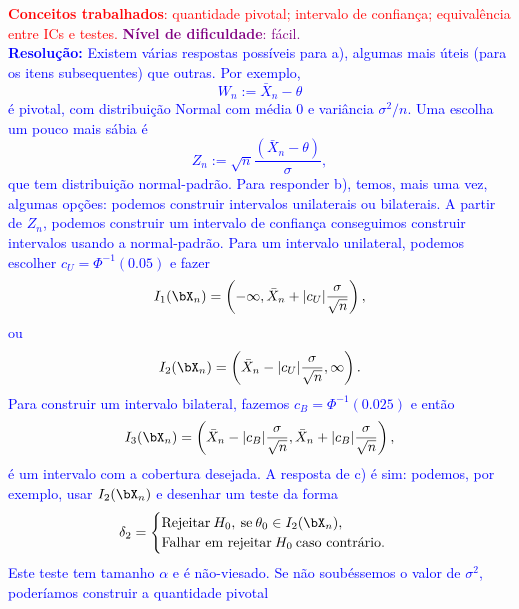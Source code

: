 \textcolor{red}{\textbf{Conceitos trabalhados}: quantidade pivotal; intervalo de confiança; equivalência entre ICs e testes.}
\textcolor{purple}{\textbf{Nível de dificuldade}: fácil.}\\
\textcolor{blue}{
\textbf{Resolução:}
Existem várias respostas possíveis para a), algumas mais úteis (para os itens subsequentes) que outras.
Por exemplo,
\begin{equation*}
    W_n := \bar{X}_n - \theta 
\end{equation*}
é pivotal, com distribuição Normal com média $0$ e variância $\sigma^2/n$.
Uma escolha um pouco mais sábia é 
\begin{equation*}
    Z_n := \sqrt{n}\frac{\left(\bar{X}_n - \theta\right)}{\sigma},
\end{equation*}
que tem distribuição normal-padrão.
Para responder b), temos, mais uma vez, algumas opções: podemos construir intervalos unilaterais ou bilaterais.
A partir de $Z_n$, podemos construir um intervalo de confiança conseguimos construir intervalos usando a normal-padrão. 
Para um intervalo unilateral, podemos escolher $c_U = \Phi^{-1}(0.05)$ e fazer
\begin{equation*}
    I_1(\bX_n) = \left(-\infty, \bar{X}_n + |c_U|\frac{\sigma}{\sqrt{n}}\right),
\end{equation*}
ou
\begin{equation*}
    I_2(\bX_n) = \left(\bar{X}_n - |c_U|\frac{\sigma}{\sqrt{n}}, \infty\right).
\end{equation*}
Para construir um intervalo bilateral, fazemos $c_B = \Phi^{-1}(0.025)$ e então
\begin{equation*}
    I_3(\bX_n) = \left(\bar{X}_n - |c_B|\frac{\sigma}{\sqrt{n}}, \bar{X}_n + |c_B|\frac{\sigma}{\sqrt{n}}\right),
\end{equation*}
é um intervalo com a cobertura desejada.
A resposta de c) é sim: podemos, por exemplo, usar $I_2(\bX_n)$ e desenhar um teste da forma
\begin{equation*}
    \delta_2 =
    \begin{cases}
    \textrm{Rejeitar}\: H_0, \: \textrm{se}\: \theta_0 \in I_2(\bX_n),\\
    \textrm{Falhar em rejeitar}\: H_0 \: \textrm{caso contrário}.
    \end{cases}
\end{equation*}
Este teste tem tamanho $\alpha$ e é não-viesado.
Se não soubéssemos o valor de $\sigma^2$, poderíamos construir a quantidade pivotal
\begin{equation*}

\end{equation*}}
